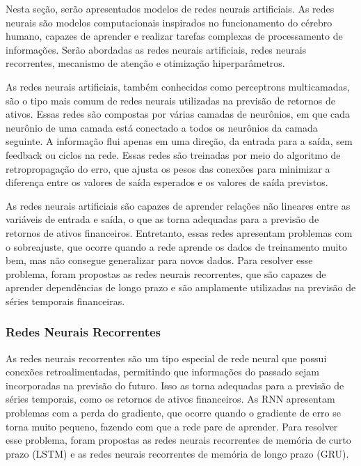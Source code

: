         Nesta seção, serão apresentados modelos de redes neurais artificiais. As redes neurais são modelos computacionais inspirados no funcionamento do cérebro humano, capazes de aprender e realizar tarefas complexas de processamento de informações. Serão abordadas as redes neurais artificiais, redes neurais recorrentes, mecanismo de atenção e otimização hiperparâmetros.
        
        \ipar As redes neurais artificiais, também conhecidas como perceptrons multicamadas, são o tipo mais comum de redes neurais utilizadas na previsão de retornos de ativos. Essas redes são compostas por várias camadas de neurônios, em que cada neurônio de uma camada está conectado a todos os neurônios da camada seguinte. A informação flui apenas em uma direção, da entrada para a saída, sem feedback ou ciclos na rede. Essas redes são treinadas por meio do algoritmo de retropropagação do erro, que ajusta os pesos das conexões para minimizar a diferença entre os valores de saída esperados e os valores de saída previstos.

        \ipar As redes neurais artificiais são capazes de aprender relações não lineares entre as variáveis de entrada e saída, o que as torna adequadas para a previsão de retornos de ativos financeiros. Entretanto, essas redes apresentam problemas com o sobreajuste, que ocorre quando a rede aprende os dados de treinamento muito bem, mas não consegue generalizar para novos dados. Para resolver esse problema, foram propostas as redes neurais recorrentes, que são capazes de aprender dependências de longo prazo e são amplamente utilizadas na previsão de séries temporais financeiras.

        \subsubsection{Redes Neurais Recorrentes}
        
            \ipar As redes neurais recorrentes são um tipo especial de rede neural que possui conexões retroalimentadas, permitindo que informações do passado sejam incorporadas na previsão do futuro. Isso as torna adequadas para a previsão de séries temporais, como os retornos de ativos financeiros. As \acrshort{RNN} apresentam problemas com a perda do gradiente, que ocorre quando o gradiente de erro se torna muito pequeno, fazendo com que a rede pare de aprender. Para resolver esse problema, foram propostas as redes neurais recorrentes de memória de curto prazo (\acrshort{LSTM}) e as redes neurais recorrentes de memória de longo prazo (\acrshort{GRU}).

